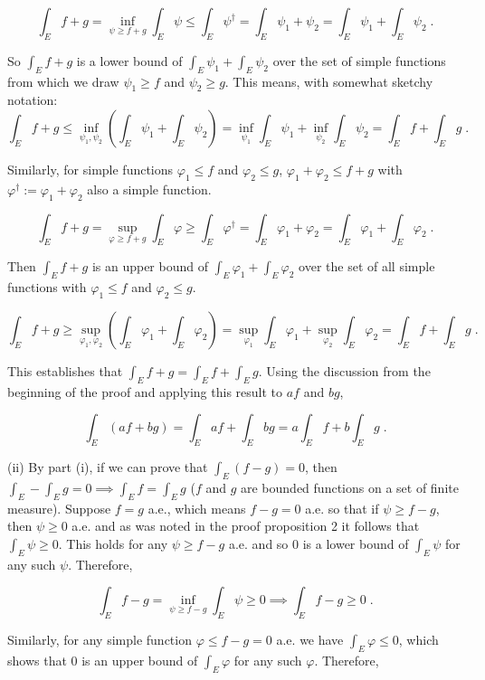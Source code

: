 \documentclass[a4paper]{article}
\begin{document}
$$\int_E f+g = \inf_{\psi \geq f+g} \int_E \psi \leq \int_E \psi^\dagger = \int_E \psi_1 + \psi_2 = \int_E \psi_1 + \int_E \psi_2 \;.$$

So $\int_E f+g$ is a lower bound of $\int_E \psi_1 + \int_E \psi_2$ over the set of simple functions from which we draw $\psi_1 \geq f$ and $\psi_2 \geq g$. This means, with somewhat sketchy notation:
$$\int_E f+g \leq \inf_{\psi_1,\psi_2} \left(\int_E \psi_1 + \int_E \psi_2\right) = \inf_{\psi_1} \int_E \psi_1 + \inf_{\psi_2} \int_E \psi_2 = \int_E f + \int_E g \;.$$ 

Similarly, for simple functions $\varphi_1 \leq f$ and $\varphi_2 \leq g$, $\varphi_1 + \varphi_2 \leq f+g$ with $\varphi^\dagger := \varphi_1 + \varphi_2$ also a simple function. 

$$\int_E f+g = \sup_{\varphi \geq f+g} \int_E \varphi \geq \int_E \varphi^\dagger = \int_E \varphi_1 + \varphi_2 = \int_E \varphi_1 + \int_E \varphi_2 \;.$$


Then $\int_E f+g$ is an upper bound of $\int_E \varphi_1 + \int_E \varphi_2$ over the set of all simple functions with $\varphi_1 \leq f$ and $\varphi_2 \leq g$. 

$$\int_E f+g \geq \sup_{\varphi_1, \varphi_2} \left(\int_E \varphi_1 + \int_E \varphi_2\right) = \sup_{\varphi_1} \int_E \varphi_1 + \sup_{\varphi_2} \int_E \varphi_2 = \int_E f+ \int_E g \;.$$

This establishes that $\int_E f + g = \int_E f + \int_E g$. Using the discussion from the beginning of the proof and applying this result to $af$ and $bg$,

$$\int_E (af+bg) = \int_E af + \int_E bg = a\int_E f + b\int_E g \;.$$

(ii) By part (i), if we can prove that $\int_E (f-g) = 0$, then $\int_E - \int_E g = 0 \implies \int_E f = \int_E g$ ($f$ and $g$ are bounded functions on a set of finite measure). Suppose $f = g$ a.e., which means $f - g = 0$ a.e. so that if $\psi \geq f - g$, then $\psi \geq 0$ a.e. and as was noted in the proof proposition 2 it follows that $\int_E \psi \geq  0$. This holds for any $\psi \geq f-g$ a.e. and so $0$ is a lower bound of $\int_E \psi$ for any such $\psi$. Therefore,

$$\int_E f-g = \inf_{\psi \geq f-g} \int_E \psi \geq 0 \implies \int_E f-g \geq 0\;.$$

Similarly, for any simple function $\varphi \leq f-g = 0$ a.e. we have $\int_E \varphi \leq 0$, which shows that $0$ is an upper bound of $\int_E \varphi$ for any such $\varphi$. Therefore,
\end{document}
